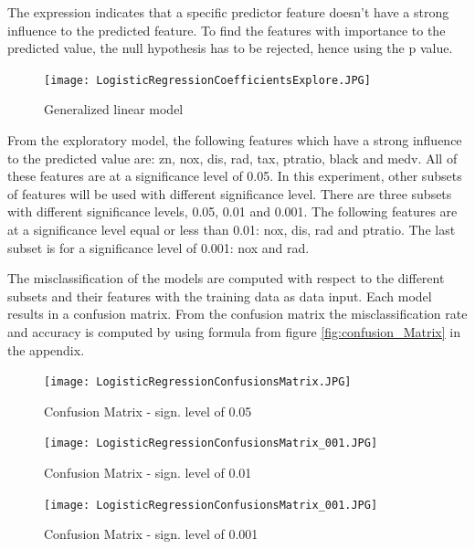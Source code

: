The expression indicates that a specific predictor feature doesn't have a strong influence to the predicted feature. To find the features with importance to the predicted value, the null hypothesis has to be rejected, hence using the p value.    


\begin{figure}[H]
\centering
\texttt{[image: LogisticRegressionCoefficientsExplore.JPG]}
\caption{Generalized linear model}
\label{fig:generalized_linear_model}
\end{figure}

From the exploratory model, the following features which have a strong influence to the predicted value are: zn, nox, dis, rad, tax, ptratio, black and medv. 
All of these features are at a significance level of 0.05. In this experiment, other subsets of features will be used with different significance level. There are three subsets with different significance levels, 0.05, 0.01 and 0.001. The following features are at a significance level equal or less than 0.01: nox, dis, rad and ptratio. The last subset is for a significance level of 0.001: nox and rad.  

The misclassification of the models are computed with respect to the different subsets and their features with the training data as data input. Each model results in a confusion matrix. From the confusion matrix the misclassification rate and accuracy is computed by using formula from figure \ref{fig:confusion_Matrix} in the appendix.  \\

\begin{figure}[h]
\centering
\begin{minipage}{0.32\textwidth}
\centering
    \texttt{[image: LogisticRegressionConfusionsMatrix.JPG]}
    \caption{Confusion Matrix - sign. level of 0.05}
    \label{fig:logistic_regression_confusions_matrix_005}
\end{minipage}\hfill
\begin{minipage}{0.32\textwidth}
\centering

\texttt{[image: LogisticRegressionConfusionsMatrix\_001.JPG]}
    \caption{Confusion Matrix - sign. level of 0.01}
    \label{fig:logistic_regression_confusions_matrix_001}
\end{minipage}\hfill
\begin{minipage}{0.32\textwidth}
\centering

\texttt{[image: LogisticRegressionConfusionsMatrix\_001.JPG]}
    \caption{Confusion Matrix - sign. level of 0.001}
    \label{fig:logistic_regression_confusions_matrix_001}
\end{minipage}
\end{figure}

